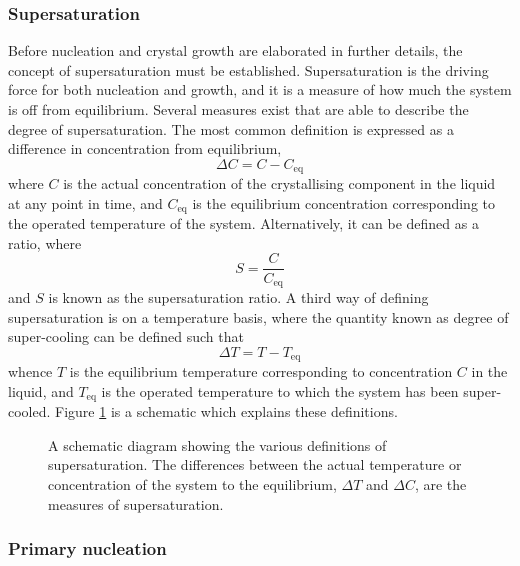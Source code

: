 \subsubsection{Supersaturation}

Before nucleation and crystal growth are elaborated in further details, the concept of supersaturation must be established. Supersaturation is the driving force for both nucleation and growth, and it is a measure of how much the system is off from equilibrium. Several measures exist that are able to describe the degree of supersaturation. The most common definition is expressed as a difference in concentration from equilibrium,
\begin{equation}\label{eq:deltaC}
    \Delta C = C - C_{\mathrm{eq}}
\end{equation}
where $C$ is the actual concentration of the crystallising component in the liquid at any point in time, and $C_{\mathrm{eq}}$ is the equilibrium concentration corresponding to the operated temperature of the system. Alternatively, it can be defined as a ratio, where
\begin{equation} \label{eq: supersaturation ratio}
    S = \frac{C}{C_{\mathrm{eq}}}
\end{equation}
and $S$ is known as the supersaturation ratio. A third way of defining supersaturation is on a temperature basis, where the quantity known as degree of super-cooling can be defined such that
\begin{equation} \label{eq:deltaT}
     \Delta T = T - T_{\mathrm{eq}}
\end{equation}
whence $T$ is the equilibrium temperature corresponding to concentration $C$ in the liquid, and $T_{\mathrm{eq}}$ is the operated temperature to which the system has been super-cooled. Figure \ref{fig:supersaturation} is a schematic which explains these definitions.

\begin{figure}[h]
\centering

\caption{A schematic diagram showing the various definitions of supersaturation. The differences between the actual temperature or concentration of the system to the equilibrium, $\Delta T$ and $\Delta C$, are the measures of supersaturation.}
\label{fig:supersaturation}
\end{figure}

\subsubsection{Primary nucleation}\label{sec:primary nucleation}

